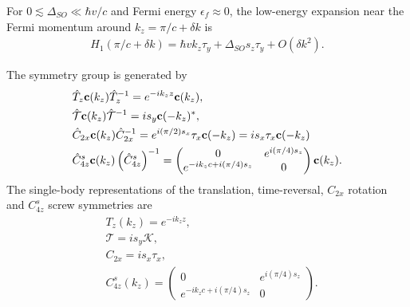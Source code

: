 For $0\lesssim\Delta_{SO}\ll\hbar v/c$ and Fermi energy $\epsilon_f\approx0$, the low-energy expansion near the Fermi momentum around $k_z=\pi/c+\delta k$ is 
\begin{align}
    H_1(\pi/c+\delta k)=\hbar vk_z\tau_y+\Delta_{SO}s_z\tau_y+O(\delta k^2).
\end{align}

The symmetry group is generated by 
\begin{align}
\begin{split}
    &\hat{T}_z{\bf c}(k_z)\hat{T}_z^{-1}=e^{-ik_zz}{\bf c}(k_z),\\&\hat{\mathcal{T}}{\bf c}(k_z)\hat{\mathcal{T}}^{-1}=is_y{\bf c}(-k_z)^\ast,\\&\hat{C}_{2x}{\bf c}(k_z)\hat{C}_{2x}^{-1}=e^{i(\pi/2)s_x}\tau_x{\bf c}(-k_z)=is_x\tau_x{\bf c}(-k_z)\\&\hat{C}^s_{4z}{\bf c}(k_z)\left(\hat{C}^s_{4z}\right)^{-1}=\begin{pmatrix}0&e^{i(\pi/4)s_z}\\e^{-ik_zc+i(\pi/4)s_z}&0\end{pmatrix}{\bf c}(k_z).
\end{split}\label{1Dchainsymm0}
\end{align} 
The single-body representations of the translation, time-reversal, $C_{2x}$ rotation and $C^s_{4z}$ screw symmetries are 
\begin{equation}
\begin{aligned}
    &T_z(k_z)=e^{-ik_zz},\\
    &\mathcal{T}=is_y\mathcal{K},\\
    &C_{2x}=is_x\tau_x,\\
    &C^s_{4z}(k_z)=\begin{pmatrix}0&e^{i(\pi/4)s_z}\\e^{-ik_zc+i(\pi/4)s_z}&0\end{pmatrix}.
\end{aligned}
\end{equation}

